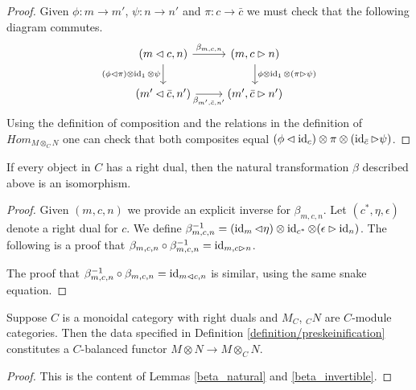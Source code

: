 \begin{proof}
  Given $\phi:m\to m'$, $\psi: n\to n'$ and $\pi:c\to \bar{c}$ we must check
  that the following diagram commutes.
  \[
    \begin{tikzcd}
      {(m\lhd c, n)} & {(m,c\rhd n)} \\
      {(m'\lhd \bar{c}, n')} & {(m',\bar{c}\rhd n')}
      \arrow["{\beta_{m,c,n}}", from=1-1, to=1-2]
      \arrow["{(\phi\lhd\pi)\otimes\id_1\otimes\psi}"', from=1-1, to=2-1]
      \arrow["{\phi\otimes\id_1\otimes(\pi\rhd\psi)}", from=1-2, to=2-2]
      \arrow["{\beta_{m',\bar{c},n'}}"', from=2-1, to=2-2]
    \end{tikzcd}
  \]
  Using the definition of composition and the relations in the definition of
  $Hom_{M\otimes_C N}$ one can check that both composites equal
  $(\phi\lhd\operatorname{id}_c)\otimes\pi\otimes(\operatorname{id}_{\bar{c}}\rhd\psi)$.
\end{proof}

\begin{lemma}\label{beta_invertible}
  If every object in $C$ has a right dual, then the natural transformation
  $\beta$ described above is an isomorphism.
\end{lemma}

\begin{proof}
  Given $(m,c,n)$ we provide an explicit inverse for $\beta_{m,c,n}$. Let
  $(c^*,\eta,\epsilon)$ denote a right dual for $c$. We define
  $\beta^{-1}_{m,c,n}=(\operatorname{id}_m\lhd\eta)\otimes\operatorname{id}_{c^*}\otimes
  (\epsilon\rhd\operatorname{id}_n)$. The following is a proof that
  $\beta_{m,c,n}\circ\beta_{m,c,n}^{-1}=\operatorname{id}_{m,c\rhd n}$.
  \begin{center}\end{center}

  The proof that $\beta_{m,c,n}^{-1}\circ\beta_{m,c,n}=\operatorname{id}_{m\lhd c,n}$ is
  similar, using the same snake equation.
\end{proof}


\begin{proposition}\label{is_balanced}

\noindent Suppose $C$ is a monoidal category with right duals and $M_C$, $_{C}N$ are
$C$-module categories. Then the data specified in
Definition \ref{definition/preskeinification} constitutes a $C$-balanced
functor $M\otimes N\to M\otimes_C N$.
\end{proposition}

\begin{proof}
  This is the content of Lemmas \ref{beta_natural} and \ref{beta_invertible}.
\end{proof}


